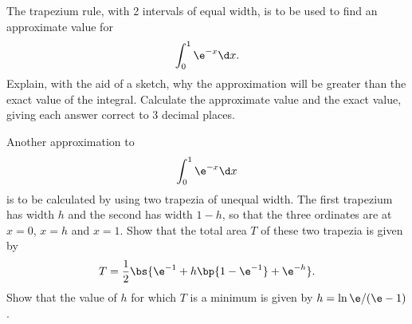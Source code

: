 \begin{problem}
    The trapezium rule, with 2 intervals of equal width, is to be used to find an approximate value for \[\int_{0}^{1}\e^{-x} \d x.\] Explain, with the aid of a sketch, why the approximation will be greater than the exact value of the integral. Calculate the approximate value and the exact value, giving each answer correct to 3 decimal places.

    Another approximation to \[\int_{0}^{1}\e^{-x} \d x\] is to be calculated by using two trapezia of unequal width. The first trapezium has width $h$ and the second has width $1-h$, so that the three ordinates are at $x=0$, $x=h$ and $x=1$. Show that the total area $T$ of these two trapezia is given by \[T = \frac12 \bs{\e^{-1} + h \bp{1 - \e^{-1}} + \e^{-h}}.\] Show that the value of $h$ for which $T$ is a minimum is given by $h=\ln{\e/(\e - 1)}$. 
\end{problem}
